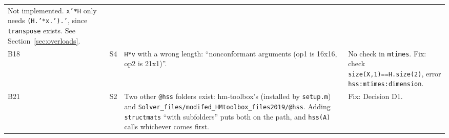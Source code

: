 \documentclass[11pt]{article}
\newcommand{\code}[1]{\texttt{#1}}
\begin{document}
\begin{small}
\begin{longtable}{@{}L{0.75cm}L{0.6cm}L{5.4cm}L{7.6cm}@{}}
Not implemented. \code{x'*H} only needs \code{(H.'*x.').'}, since \code{transpose} exists. See
Section~\ref{sec:overloads}.\\
B18 & S4 & \code{H*v} with a wrong length: ``nonconformant arguments (op1 is 16x16, op2 is 21x1)''. &
No check in \code{mtimes}. Fix: check \code{size(X,1)==H.size(2)}, error \code{hss:mtimes:dimension}.\\
B21 & S2 & Two other \code{@hss} folders exist: hm-toolbox's (installed by \code{setup.m}) and
\code{Solver\_files/\allowbreak modifed\_HMtoolbox\_files2019/\allowbreak @hss}. Adding \code{structmats} ``with subfolders'' puts both on
the path, and \code{hss(A)} calls whichever comes first. & Fix: Decision D1.\\
\end{longtable}
\end{small}
\end{document}
